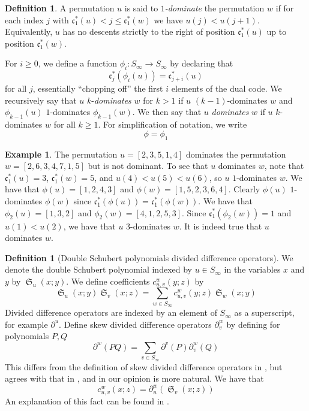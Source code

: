 \documentclass{amsart}
\theoremstyle{definition}
\newtheorem{definition}[lemma]{Definition}
\newtheorem{example}[lemma]{Example}
\theoremstyle{remark}
\numberwithin{equation}{subsection}
\DeclareMathOperator{\sch}{\mathfrak{S}}
\newcommand{\code}{\mathfrak{c}}
\begin{document}
	\begin{definition} \label{definition:domination}
		A permutation $u$ is said to \emph{$1$-dominate} the permutation $w$ if for each index $j$ with $\code_1^*(u)<j\leq \code_1^*(w)$ we have $u(j)<u(j+1)$. Equivalently, $u$ has no descents strictly to the right of position $\code_1^*(u)$ up to position $\code_1^*(w)$. 
		
		For $i\geq 0$, we define a function $\phi_i:S_\infty\to S_\infty$ by declaring that
		$$\code^*_j(\phi_i(u))=\code^*_{j+i}(u)$$
		for all $j$, essentially ``chopping off'' the first $i$ elements of the dual code. We recursively say that $u$ $k$-\emph{dominates} $w$ for $k>1$ if $u$ $(k-1)$-dominates $w$ and $\phi_{k-1}(u)$ $1$-dominates $\phi_{k-1}(w)$. We then say that $u$ \emph{dominates} $w$ if $u$ $k$-dominates $w$ for all $k\geq 1$. For simplification of notation, we write
		$$\phi=\phi_1$$
	\end{definition}
	
	
	\begin{example}
		The permutation $u=[2,3,5,1,4]$ dominates the permutation $w=[2,6,3,4,7,1,5]$ but is not dominant. To see that $u$ dominates $w$, note that $\code_1^*(u)=3$, $\code_1^*(w)=5$, and $u(4)<u(5)<u(6)$, so $u$ $1$-dominates $w$. We have that $\phi(u)=[1,2,4,3]$ and $\phi(w)=[1,5,2,3,6,4]$. Clearly $\phi(u)$ $1$-dominates $\phi(w)$ since $\code_1^*(\phi(u))=\code_1^*(\phi(w))$. We have that $\phi_2(u)=[1,3,2]$ and $\phi_2(w)=[4,1,2,5,3]$. Since $\code_1^*(\phi_2(w))=1$ and $u(1)<u(2)$, we have that $u$ $3$-dominates $w$. It is indeed true that $u$ dominates $w$.
	\end{example}
	
	
	
	\begin{definition}[Double Schubert polynomials divided difference operators] \label{definition:schubert}
		We denote the double Schubert polynomial indexed by $u\in S_\infty$ in the variables $x$ and $y$ by $\sch_u(x;y)$. We define coefficients $c_{u,v}^w(y;z)$ by
		$$\sch_u(x;y)\sch_v(x;z)=\sum_{w\in S_\infty} c_{u,v}^w(y;z)\sch_w(x;y)$$
		Divided difference operators are indexed by an element of $S_\infty$ as a superscript, for example $\partial^u$. Define skew divided difference operators $\partial_v^w$ by defining for polynomials $P,Q$
		$$\partial^w(PQ)=\sum_{v\in S_\infty}\partial^v(P)\partial_v^w(Q)$$
		This differs from the definition of skew divided difference operators in \cite{notes}, but agrees with that in \cite{samuelleibniz}, and in our opinion is more natural. We have that
		$$c_{u,v}^w(x;z)=\partial_u^w(\sch_v(x;z))$$
		An explanation of this fact can be found in \cite{samuelmolev}.
	\end{definition}
	
\end{document}
